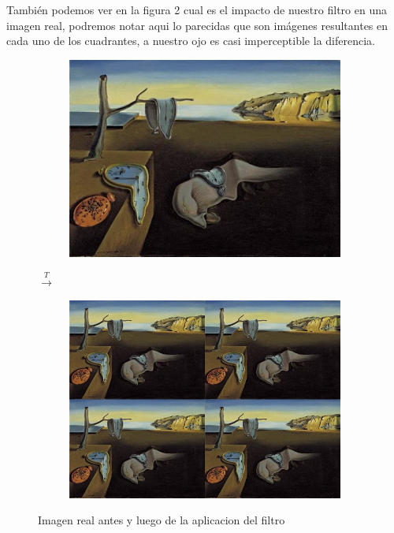 También podemos ver en la figura 2 cual es el impacto de nuestro filtro en una imagen real, podremos notar aqui lo parecidas que son imágenes resultantes en cada uno de los cuadrantes, a nuestro ojo es casi imperceptible la diferencia.

\begin{figure}[H]
\begin{subfigure}[b]{0.50\textwidth} 
\includegraphics[scale=0.4]{img/fourCombine_before.jpg}
\end{subfigure}
{\LARGE$\xrightarrow{T}$}
\begin{subfigure}[b]{0.50\textwidth} 
\includegraphics[scale=0.4]{img/fourCombine_after.jpg}
\end{subfigure}

\caption{Imagen real antes y luego de la aplicacion del filtro}
\end{figure}

